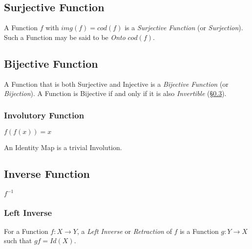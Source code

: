 \subsection{Surjective Function}\label{sec:surjective_function}

A Function $f$ with $img(f) = cod(f)$ is a \emph{Surjective Function}
(or \emph{Surjection}). Such a Function may be said to be \emph{Onto}
$cod(f)$.



\subsection{Bijective Function}\label{sec:bijective_function}

A Function that is both Surjective and Injective is a \emph{Bijective
  Function} (or \emph{Bijection}). A Function is Bijective if and only
if it is also \emph{Invertible} (\S\ref{sec:inverse_function}).



\subsubsection{Involutory Function}\label{sec:involution}

$f(f(x)) = x$

An Identity Map is a trivial Involution.



\subsection{Inverse Function}\label{sec:inverse_function}

$f^{-1}$



\subsubsection{Left Inverse}\label{sec:left_inverse}

For a Function $f: X \rightarrow Y$, a \emph{Left Inverse} or
\emph{Retraction} of $f$ is a Function $g: Y \rightarrow X$ such that
$gf = Id(X)$.



